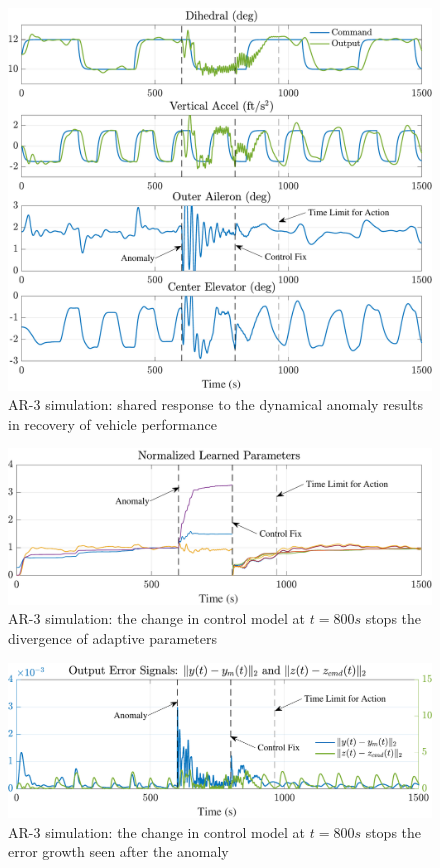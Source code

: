 \documentclass[english]{ifacconf}
\begin{document}
\begin{figure}[htbp]
	\centering
	\includegraphics[width=\columnwidth]{../fig/ar3.pdf}
	\caption{AR-3 simulation: shared response to the dynamical anomaly results in recovery of vehicle performance}
	\label{fig:ar3-sim}
\end{figure}

\begin{figure}[htbp]
	\centering
	\includegraphics[width=\columnwidth]{../fig/ar3-params.pdf}
	\caption{AR-3 simulation: the change in control model at $t = 800 s$ stops the divergence of adaptive parameters}
	\label{fig:ar3-params}
\end{figure}

\begin{figure}[htbp]
	\centering
	\includegraphics[width=\columnwidth]{../fig/ar3-err.pdf}
	\caption{AR-3 simulation: the change in control model at $t = 800 s$ stops the error growth seen after the anomaly}
	\label{fig:ar3-err}
\end{figure}


\end{document}
